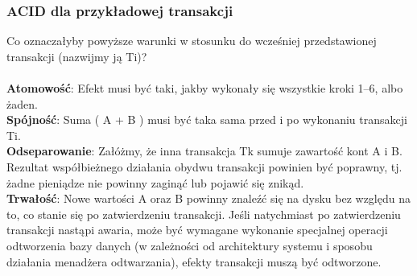 \documentclass[main.tex]{subfiles}
\begin{document}
    \subsubsection{ACID dla przykładowej transakcji}
    Co oznaczałyby powyższe warunki w stosunku do wcześniej przedstawionej transakcji (nazwijmy ją Ti)?
    \\\\
    \textbf{Atomowość}: Efekt musi być taki, jakby wykonały się wszystkie kroki 1--6, albo żaden.\\
    \textbf{Spójność}: Suma ( A + B ) musi być taka sama przed i po wykonaniu transakcji Ti.\\
    \textbf{Odseparowanie}: Załóżmy, że inna transakcja Tk sumuje zawartość kont A i B. Rezultat
    współbieżnego działania obydwu transakcji powinien być poprawny, tj. żadne
    pieniądze nie powinny zaginąć lub pojawić się znikąd.\\
    \textbf{Trwałość}: Nowe wartości A oraz B powinny znaleźć się na dysku bez względu na to, co
    stanie się po zatwierdzeniu transakcji. Jeśli natychmiast po zatwierdzeniu
    transakcji nastąpi awaria, może być wymagane wykonanie specjalnej operacji
    odtworzenia bazy danych (w zależności od architektury systemu i sposobu
    działania menadżera odtwarzania), efekty transakcji muszą być odtworzone.\\
\end{document}
